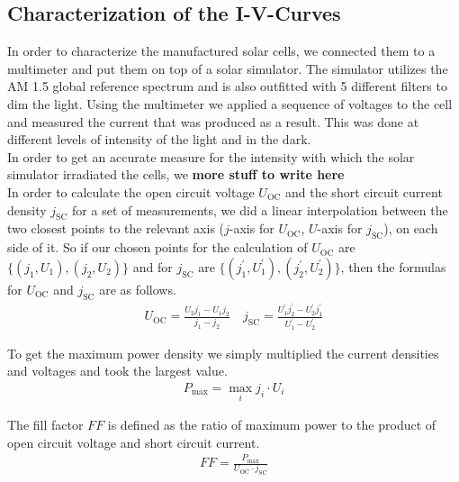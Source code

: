 \documentclass[a4paper,10pt,twocolumn]{article}
\begin{document}
\begin{extract*}

\newcommand{\Uoc}{U_{\text{OC}}}
\newcommand{\jsc}{j_{\text{SC}}}
\newcommand{\Pmax}{P_{\text{max}}}
\newcommand{\meann}[1]{\langle #1 \rangle_n}

\section{Characterization of the I-V-Curves}\label{sec:charac}

In order to characterize the manufactured solar cells, we connected them to a multimeter and put them on top of a solar simulator. The simulator utilizes the AM 1.5 global reference spectrum and is also outfitted with 5 different filters to dim the light. Using the multimeter we applied a sequence of voltages to the cell and measured the current that was produced as a result. This was done at different levels of intensity of the light and in the dark.\\
In order to get an accurate measure for the intensity with which the solar simulator irradiated the cells, we \textbf{more stuff to write here}\\
In order to calculate the open circuit voltage $\Uoc$ and the short circuit current density $\jsc$ for a set of measurements, we did a linear interpolation between the two closest points to the relevant axis ($j$-axis for $\Uoc$, $U$-axis for $\jsc$), on each side of it. So if our chosen points for the calculation of $\Uoc$ are $\{(j_1,U_1),(j_2,U_2)\}$ and for $\jsc$ are $\{(j_1^\prime,U_1^\prime),(j_2^\prime,U_2^\prime)\}$, then the formulas for $\Uoc$ and $\jsc$ are as follows.
\begin{align}
	\Uoc = \frac{U_2 j_1 - U_1 j_2}{j_1-j_2}\quad \jsc = \frac{U_1^\prime j_2^\prime - U_2^\prime j_1^\prime}{U_1^\prime-U_2^\prime}
\end{align}

To get the maximum power density we simply multiplied the current densities and voltages and took the largest value.
\begin{align}
	\Pmax = \max_{i} j_i\cdot U_i
\end{align}

The fill factor $FF$ is defined as the ratio of maximum power to the product of open circuit voltage and short circuit current.
\begin{align}
	FF = \frac{\Pmax}{\Uoc \cdot \jsc}
\end{align}


\end{extract*}
\end{document}

